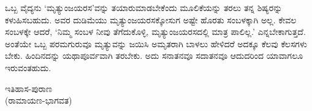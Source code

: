ಒಬ್ಬ ವೈದ್ಯನು `ಮೃತ್ಯುಂಜಯರಸ'ವನ್ನು ತಯಾರುಮಾಡಬೇಕೆಂದು ಮೂಲಿಕೆಯನ್ನು ತರಲು ತನ್ನ ಶಿಷ್ಯರನ್ನು ಕಳುಹಿಸಬಹುದು. ಅವರ ದುಡಿಮೆಯು ಮೃತ್ಯುಂಜಯರಸಕ್ಕೋಸುಗ ಅಷ್ಟೇ ಹೊರತು ಸಂಬಳಕ್ಕಾಗಿ ಅಲ್ಲ. ಕೇವಲ ಸಂಬಳಕ್ಕೇ ಆದರೆ, `ನಿಮ್ಮ ಸಂಬಳ ನೀವು ತೆಗೆದುಕೊಳ್ಳಿ, ಮೃತ್ಯುಂಜಯರಸದಲ್ಲಿ ಮಾತ್ರ ಪಾಲಿಲ್ಲ.' ಎನ್ನಬೇಕಾಗುತ್ತದೆ. ಅಂತೆಯೇ ಒಬ್ಬ ಪರಮಗುರುವೂ ಮೃತ್ಯುವನ್ನು ಜಯಿಸಿ ಅಮೃತರಾಗಿ ಬಾಳಲು ಹೇಳಿದರೆ ಅದಕ್ಕೂ ಕೆಲವು ಕೆಲಸಗಳು ಬೇಕು. ಹಿಂದಿನದನ್ನು ಯಥಾಪೂರ್ವವಾಗಿ ತರಬೇಕು. ಅದು ಸನಾತನವೂ ಸದಾತನವೂ ಆದುದರಿಂದ ಯಾವಾಗಲೂ ಇರುವಂತಹುದು. 


\newpage 

\thispagestyle{empty}

\begin{center} 

{\LARGE ಇತಿಹಾಸ-ಪುರಾಣ}\\ 

{\LARGE (ರಾಮಾಯಣ-ಭಾಗವತ)} 
\end{center} 

\newpage

\thispagestyle{empty}

\newpage


